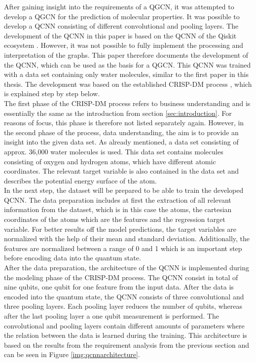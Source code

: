 After gaining insight into the requirements of a QGCN, it was attempted to develop a QGCN for the prediction of molecular properties. It was possible to develop a QCNN consisting of different convolutional and pooling layers. The development of the QCNN in this paper is based on the QCNN of the Qiskit ecosystem \cite{qcnn}. However, it was not possible to fully implement the processing and interpretation of the graphs. This paper therefore documents the development of the QCNN, which can be used as the basis for a QGCN. This QCNN was trained with a data set containing only water molecules, similar to the first paper in this thesis. The development was based on the established CRISP-DM process \cite{wirth2000crisp}, which is explained step by step below. \\

The first phase of the CRISP-DM process refers to business understanding and is essentially the same as the introduction from section \ref{sec:introduction}. For reasons of focus, this phase is therefore not listed separately again. However, in the second phase of the process, data understanding, the aim is to provide an insight into the given data set. As already mentioned, a data set consisting of approx. 36,000 water molecules is used.  This data set contains molecules consisting of oxygen and hydrogen atoms, which have different atomic coordinates. The relevant target variable is also contained in the data set and describes the potential energy surface of the atom. \\

In the next step, the dataset will be prepared to be able to train the developed QCNN. The data preparation includes at first the extraction of all relevant information from the dataset, which is in this case the atoms, the cartesian coordinates of the atoms which are the features and the regression target variable. For better results off the model predictions, the target variables are normalized with the help of their mean and standard deviation. Additionally, the features are normalized between a range of 0 and 1 which is an important step before encoding data into the quantum state. \\

After the data preparation, the architecture of the QCNN is implemented during the modeling phase of the CRISP-DM process. The QCNN consist in total of nine qubits, one qubit for one feature from the input data. After the data is encoded into the quantum state, the QCNN consists of three convolutional and three pooling layers. Each pooling layer reduces the number of qubits, whereas after the last pooling layer a one qubit measurement is performed. The convolutional and pooling layers contain different amounts of parameters where the relation between the data is learned during the training. This architecture is based on the results from the requirement analysis from the previous section and can be seen in Figure \ref{img:qcnnarchitecture}. \\

